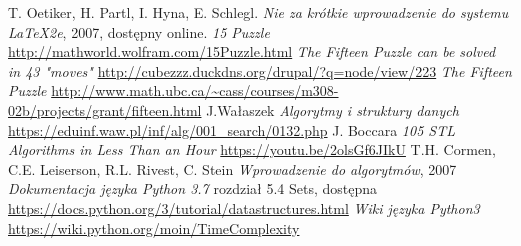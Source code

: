 \documentclass{classrep}
\begin{document}
\begin{thebibliography}{0}
   T. Oetiker, H. Partl, I. Hyna, E. Schlegl.
    \textsl{Nie za krótkie wprowadzenie do systemu \LaTeX2e}, 2007, dostępny
    online.
   \textsl{15 Puzzle} \url{http://mathworld.wolfram.com/15Puzzle.html}
   \textsl{The Fifteen Puzzle can be solved in 43 "moves"} \url{http://cubezzz.duckdns.org/drupal/?q=node/view/223}
   \textsl{The Fifteen Puzzle} \url{http://www.math.ubc.ca/~cass/courses/m308-02b/projects/grant/fifteen.html}
    J.Wałaszek \textsl{Algorytmy i struktury danych}
   \url{https://eduinf.waw.pl/inf/alg/001_search/0132.php}
    J. Boccara \textsl{105 STL Algorithms in Less Than an Hour} 
   \url{https://youtu.be/2olsGf6JIkU}
    T.H. Cormen, C.E. Leiserson, R.L. Rivest, C. Stein \textsl{Wprowadzenie do algorytmów}, 2007
    \textsl{Dokumentacja języka Python 3.7} rozdział 5.4 Sets, dostępna \url{https://docs.python.org/3/tutorial/datastructures.html}
    \textsl{Wiki języka Python3} \url{https://wiki.python.org/moin/TimeComplexity}
\end{thebibliography}
\end{document}
